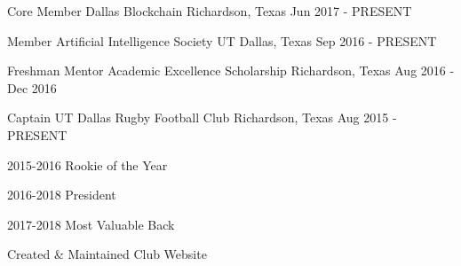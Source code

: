 

\begin{cventries}

	\cventry
	{Core Member} %
	{Dallas Blockchain} %
	{Richardson, Texas} %
	{Jun 2017 - PRESENT} %
	{
		\begin{cvitems} %
		\end{cvitems}
	}

	\cventry
	{Member} %
	{Artificial Intelligence Society} %
	{UT Dallas, Texas} %
	{Sep 2016 - PRESENT} %
	{
		\begin{cvitems} %
		\end{cvitems}
	}

	\cventry
	{Freshman Mentor} %
	{Academic Excellence Scholarship} %
	{Richardson, Texas} %
	{Aug 2016 - Dec 2016} %
	{
		\begin{cvitems} %
		\end{cvitems}
	}

	\cventry
	{Captain} %
	{UT Dallas Rugby Football Club} %
	{Richardson, Texas} %
	{Aug 2015 - PRESENT} %
	{
		\begin{cvitems} %
			\item {2015-2016 Rookie of the Year}
			\item {2016-2018 President}
			\item {2017-2018 Most Valuable Back}
			\item {Created \& Maintained Club Website}
		\end{cvitems}
	}

\end{cventries}
